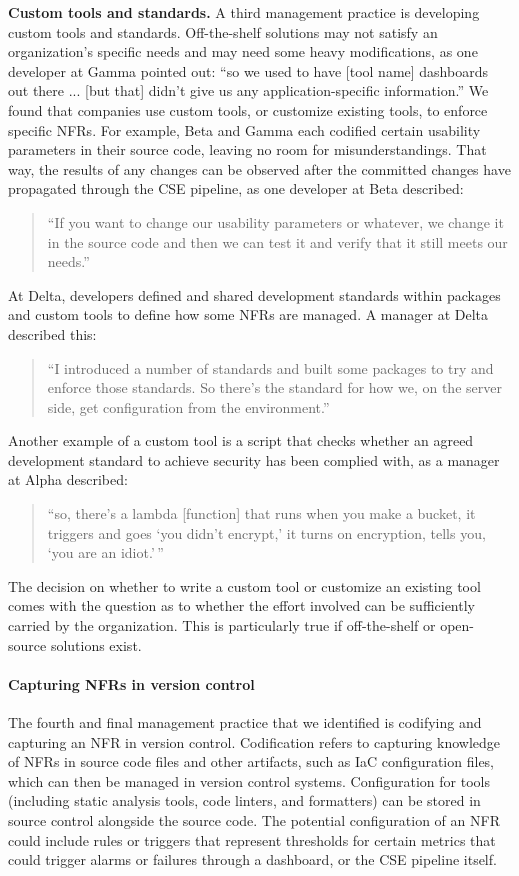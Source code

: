\documentclass[smallextended]{svjour3}
\begin{document}
\textbf{Custom tools and standards.} A third management practice is developing custom tools and standards. 
Off-the-shelf solutions may not satisfy an organization's specific needs and may need some heavy modifications, as one developer at Gamma pointed out:
\textmd{``so we used to have [tool name] dashboards out there ... [but that] didn't give us any application-specific information.''}
We found that companies use custom tools, or customize existing tools, to enforce specific NFRs. 
For example, Beta and Gamma each codified certain usability parameters in their source code, leaving no room for misunderstandings. That way, the results of any changes can be observed after the committed changes have propagated through the CSE pipeline, as one developer at Beta described:
\begin{quote}
    ``If you want to change our usability parameters or whatever, we change it in the source code and then we can test it and verify that it still meets our needs.''
\end{quote}    

\noindent At Delta, developers defined and shared development standards within packages and custom tools to define how some NFRs are managed. A manager at Delta described this:
\begin{quote}
    ``I introduced a number of standards and built some packages to try and enforce those standards. So there's the standard for how we, on the server side, get configuration from the environment.''
\end{quote}
Another example of a custom tool is a script that checks whether an agreed development standard to achieve security has been complied with, as a manager at Alpha described:
\begin{quote}
    ``so, there's a lambda [function] that runs when you make a bucket, it triggers and goes `you didn't encrypt,' it turns on encryption, tells you, `you are an idiot.'\,''    
\end{quote}


The decision on whether to write a custom tool or customize an existing tool comes with the question as to whether the effort involved can be sufficiently carried by the organization. This is particularly true if off-the-shelf or open-source solutions exist.

\paragraph{Capturing NFRs in version control} The fourth and final management practice that we identified is codifying and capturing an NFR in version control. 
Codification refers to capturing knowledge of NFRs in source code files and other artifacts, such as IaC configuration files, which can then be managed in version control systems.
Configuration for tools (including static analysis tools, code linters, and formatters) can be stored in source control alongside the source code.
The potential configuration of an NFR could include rules or triggers that represent thresholds for certain metrics that could trigger alarms or failures through a dashboard, or the CSE pipeline itself.
\end{document}
